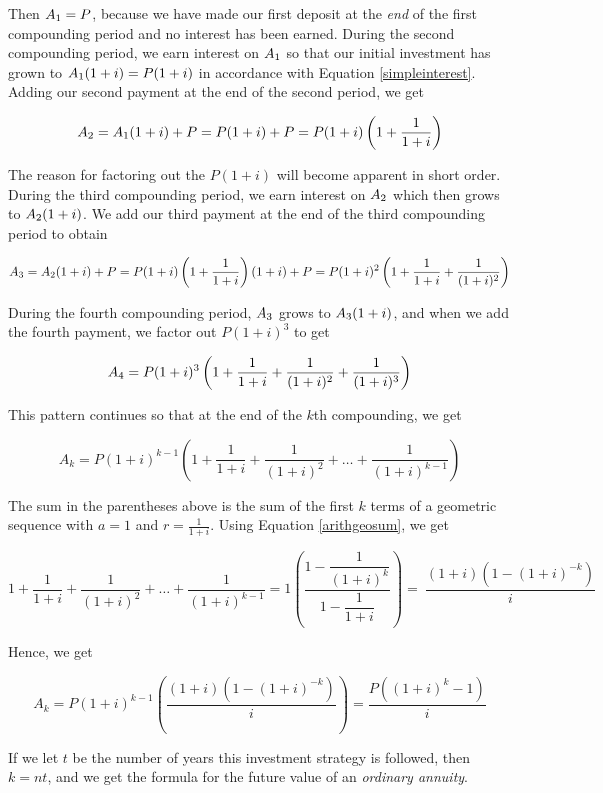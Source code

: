 Then $A_{\mbox{\scriptsize$1$}} = P$, because we have  made our first deposit at the \textit{end} of the first compounding period and no interest has been earned.  During the second compounding period, we earn interest on $A_{\mbox{\scriptsize$1$}}$ so that our initial investment has grown to $A_{\mbox{\scriptsize$1$}}(1+i) = P(1+i)$ in accordance with Equation \ref{simpleinterest}.  Adding our second payment at the end of the second period, we get

\[A_{\mbox{\scriptsize$2$}} = A_{\mbox{\scriptsize$1$}}(1+i) + P = P(1+i) + P = P(1+i)\left(1 + \dfrac{1}{1+i}\right)\]

The reason for factoring out the $P(1+i)$ will become apparent in short order. During the third compounding period, we earn interest on $A_{\mbox{\scriptsize$2$}}$ which then grows to $A_{\mbox{\scriptsize$2$}}(1+i)$.  We add our third payment at the end of the third compounding period to obtain

\[A_{\mbox{\scriptsize$3$}} = A_{\mbox{\scriptsize$2$}}(1+i) + P = P(1+i)\left(1 + \dfrac{1}{1+i}\right)(1+i) + P = P(1+i)^2\left(1 + \dfrac{1}{1+i} + \dfrac{1}{(1+i)^2}\right)\]

During the fourth compounding period, $A_{\mbox{\scriptsize$3$}}$ grows to $A_{\mbox{\scriptsize$3$}}(1+i)$, and when we add the fourth payment, we factor out $P(1+i)^3$ to get

\[A_{\mbox{\scriptsize$4$}} = P(1+i)^3 \left(1 + \dfrac{1}{1+i} + \dfrac{1}{(1+i)^2} + \dfrac{1}{(1+i)^3}\right)\]

This pattern continues so that at the end of the $k$th compounding, we get 

\[A_{k} = P(1+i)^{k-1} \left(1 + \dfrac{1}{1+i} + \dfrac{1}{(1+i)^2} + \ldots + \dfrac{1}{(1+i)^{k-1}}\right) \]

The sum in the parentheses above is the sum of the first $k$ terms of a geometric sequence with $a = 1$ and $r = \frac{1}{1+i}$.  Using Equation \ref{arithgeosum}, we get

\[1 + \dfrac{1}{1+i} + \dfrac{1}{(1+i)^2} + \ldots + \dfrac{1}{(1+i)^{k-1}} = 1 \left(\dfrac{1 - \dfrac{1}{(1+i)^k}}{1 - \dfrac{1}{1+i}}\right) = \
\dfrac{(1+i)\left(1 - (1+i)^{-k}\right)}{i}\]

Hence, we get

\[A_{k} = P(1+i)^{k-1} \left(\dfrac{(1+i)\left(1 - (1+i)^{-k}\right)}{i}\right) = \dfrac{P\left((1+i)^k - 1\right)}{i}\]

If we let $t$ be the number of years this investment strategy is followed, then $k = nt$, and we get the formula for the future value of an  \textit{ordinary annuity}.

